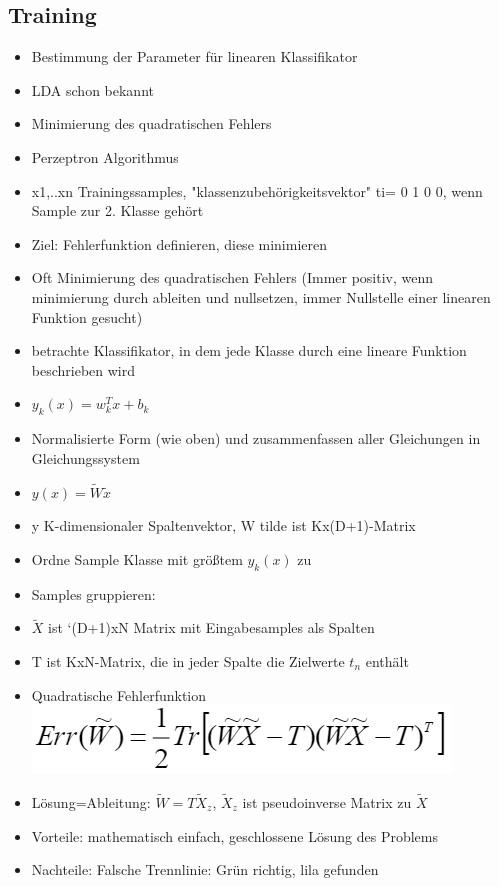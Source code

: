 \documentclass[a4paper,10pt,oneside]{article}
\begin{document}
\subsection{Training}
\begin{itemize}
	\item Bestimmung der Parameter für linearen Klassifikator
	\item LDA schon bekannt
	\item Minimierung des quadratischen Fehlers
	\item Perzeptron Algorithmus
	\item x1,..xn Trainingssamples, "klassenzubehörigkeitsvektor" ti= 0 1 0 0, wenn Sample zur 2. Klasse gehört
	\item Ziel: Fehlerfunktion definieren, diese minimieren
	\item Oft Minimierung des quadratischen Fehlers (Immer positiv, wenn minimierung durch ableiten und nullsetzen, immer Nullstelle einer linearen Funktion gesucht)
	\item betrachte Klassifikator, in dem jede Klasse durch eine lineare Funktion beschrieben wird
	\item $y_k(x) = w_k^Tx+b_k$
	\item Normalisierte Form (wie oben) und zusammenfassen aller Gleichungen in Gleichungssystem
	\item $y(x)= \tilde{W}\tilde{x}$
	\item y K-dimensionaler Spaltenvektor, W tilde ist Kx(D+1)-Matrix
	\item Ordne Sample Klasse mit größtem $y_k(x)$ zu
	\item Samples gruppieren:
	\item $\tilde{X}$ ist `(D+1)xN Matrix mit Eingabesamples als Spalten
	\item T ist KxN-Matrix, die in jeder Spalte die Zielwerte $t_n$ enthält
	\item Quadratische Fehlerfunktion
	\includegraphics[scale=0.65]{Grafiken/fehler.png}
	\item Lösung=Ableitung: $\tilde{W}=T\tilde{X}_z$, $\tilde{X}_z$ ist pseudoinverse Matrix zu $\tilde{X}$
	\item Vorteile: mathematisch einfach, geschlossene Lösung des Problems
	\item Nachteile: Falsche Trennlinie: Grün richtig, lila gefunden

\end{itemize}
\end{document}
